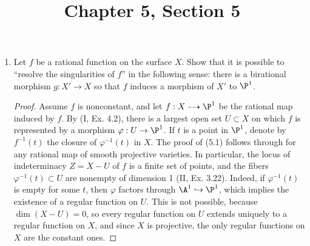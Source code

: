 \documentclass[a4paper]{article}
\title{Chapter 5, Section 5}
\begin{document}
\maketitle

\begin{enumerate} [label=\textbf{\arabic*.}, leftmargin=0em]

    \item Let $f$ be a rational function on the surface $X$.
          Show that it is possible to ``resolve the singularities of $f$'' in the following sense: there is a birational morphism $g : X' \to X$ so that $f$ induces a morphism of $X'$ to $\P^1$.

          \begin{proof}
              Assume $f$ is nonconstant, and let $f : X \dashrightarrow \P^1$ be the rational map induced by $f$.
              By (I, Ex. 4.2), there is a largest open set $U \subset X$ on which $f$ is represented by a morphism $\varphi : U \to \P^1$.
              If $t$ is a point in $\P^1$, denote by $f^{-1}(t)$ the closure of $\varphi^{-1}(t)$ in $X$.
              The proof of (5.1) follows through for any rational map of smooth projective varieties.
              In particular, the locus of indeterminacy $Z = X - U$ of $f$ is a finite set of points, and the fibers $\varphi^{-1}(t) \subset U$ are nonempty of dimension 1 (II, Ex. 3.22).
              Indeed, if $\varphi^{-1}(t)$ is empty for some $t$, then $\varphi$ factors through $\A^1 \hookrightarrow \P^1$, which implies the existence of a regular function on $U$.
              This is not possible, because $\dim(X - U) = 0$, so every regular function on $U$ extends uniquely to a regular function on $X$, and since $X$ is projective, the only regular functions on $X$ are the constant ones.


\end{proof}
\end{enumerate}
\end{document}
